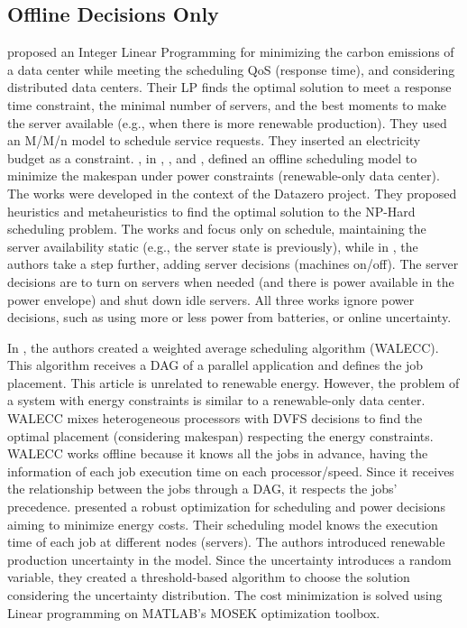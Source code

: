 \subsection{Offline Decisions Only}
\citeauthor{gu2015green} \cite{gu2015green} proposed an Integer Linear Programming for minimizing the carbon emissions of a data center while meeting the scheduling QoS (response time), and considering distributed data centers. Their LP finds the optimal solution to meet a response time constraint, the minimal number of servers, and the best moments to make the server available (e.g., when there is more renewable production). They used an M/M/n model to schedule service requests. They inserted an electricity budget as a constraint. \citeauthor{kassab2017scheduling}, in \cite{kassab2017scheduling}, \cite{kassab2018assessing}, and \cite{kassab2019green}, defined an offline scheduling model to minimize the makespan under power constraints (renewable-only data center). The works were developed in the context of the Datazero project. They proposed heuristics and metaheuristics to find the optimal solution to the NP-Hard scheduling problem. The works \cite{kassab2017scheduling} and \cite{kassab2018assessing} focus only on schedule, maintaining the server availability static (e.g., the server state is previously), while in \cite{kassab2019green}, the authors take a step further, adding server decisions (machines on/off). The server decisions are to turn on servers when needed (and there is power available in the power envelope) and shut down idle servers. All three works ignore power decisions, such as using more or less power from batteries, or online uncertainty.

In \cite{hu2018schedule}, the authors created a weighted average scheduling algorithm (WALECC). This algorithm receives a DAG of a parallel application and defines the job placement. This article is unrelated to renewable energy. However, the problem of a system with energy constraints is similar to a renewable-only data center. WALECC mixes heterogeneous processors with DVFS decisions to find the optimal placement (considering makespan) respecting the energy constraints. WALECC works offline because it knows all the jobs in advance, having the information of each job execution time on each processor/speed. Since it receives the relationship between the jobs through a DAG, it respects the jobs' precedence. \citeauthor{lu2018energy} \cite{lu2018energy} presented a robust optimization for scheduling and power decisions aiming to minimize energy costs. Their scheduling model knows the execution time of each job at different nodes (servers). The authors introduced renewable production uncertainty in the model. Since the uncertainty introduces a random variable, they created a threshold-based algorithm to choose the solution considering the uncertainty distribution. The cost minimization is solved using Linear programming on MATLAB's MOSEK optimization toolbox.

